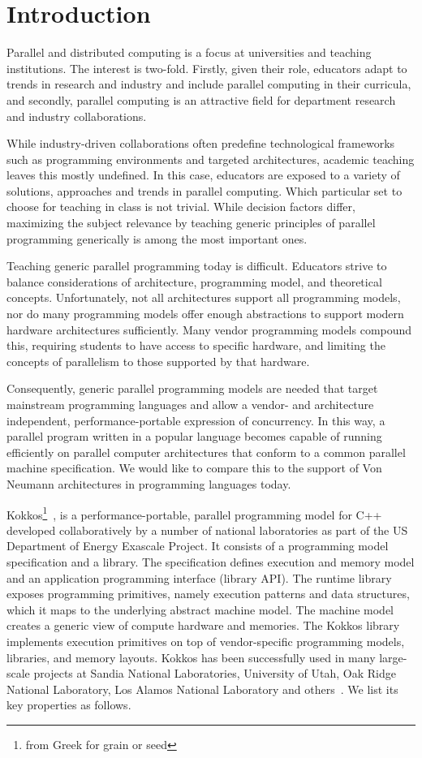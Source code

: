 
\section{Introduction}\label{chap:introduction}

Parallel and distributed computing is a focus at universities and teaching institutions. The interest is two-fold. Firstly, given their role, educators adapt to trends in research and industry and include parallel computing in their curricula, and secondly, parallel computing is an attractive field for department research and industry collaborations. 

While industry-driven collaborations often predefine technological frameworks such as programming environments and targeted architectures, academic teaching leaves this mostly undefined. In this case, educators are exposed to a variety of solutions, approaches and trends in parallel computing. Which particular set to choose for teaching in class is not trivial. While decision factors differ, maximizing the subject relevance by teaching generic principles of parallel programming generically is among the most important ones. 

Teaching generic parallel programming today is difficult. Educators strive to balance considerations of architecture, programming model, and theoretical concepts. Unfortunately, not all architectures support all programming models, nor do many programming models offer enough abstractions to support modern hardware architectures sufficiently. Many vendor programming models compound this, requiring students to have access to specific hardware, and limiting the concepts of parallelism to those supported by that hardware. 

Consequently, generic parallel programming models are needed that target mainstream programming languages and allow a vendor- and architecture independent, performance-portable expression of concurrency. In this way, a parallel program written in a popular language becomes capable of running efficiently on parallel computer architectures that conform to a common parallel machine specification. We would like to compare this to the support of Von Neumann architectures in programming languages today.

Kokkos\footnote{from Greek for grain or seed}~\cite{KOKKOS}, is a performance-portable, parallel programming model for C++ developed collaboratively by a number of national laboratories as part of the US Department of Energy Exascale Project\cite{ECP}. It consists of a programming model specification and a library. The specification defines execution and memory model and an application programming interface (library API). The runtime library exposes programming primitives, namely execution patterns and data structures, which it maps to the underlying abstract machine model. The machine model creates a generic view of compute hardware and memories. The Kokkos library implements execution primitives on top of vendor-specific programming models, libraries, and memory layouts. Kokkos has been successfully used in many large-scale projects at Sandia National Laboratories, University of Utah, Oak Ridge National Laboratory, Los Alamos National Laboratory and others~\cite{KOKKOSPROJS}. We list its key properties as follows.


